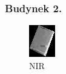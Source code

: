 \documentclass[a4paper,12pt]{article}  %
\begin{document}
\subsubsection{Budynek 2.}
\begin{figure}[H]
    \centering
    \begin{minipage}{0.24\textwidth}
        \centering
        \includegraphics[width=\linewidth]{spektralne/nir_budynek0.png}
        \caption*{NIR}
    \end{minipage}
    \begin{minipage}{0.24\textwidth}
        \centering

\end{minipage}
\end{figure}
\end{document}

